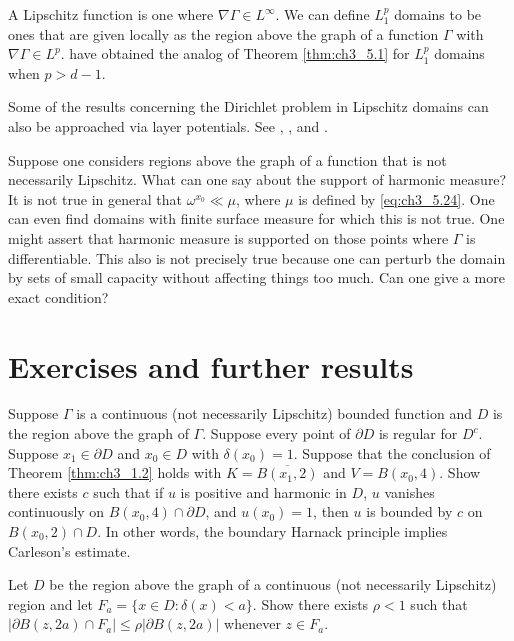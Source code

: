 
A Lipschitz function is one where $\nabla\Gamma \in L^\infty$. We can define $L_1^p$ domains to be ones that are given locally as the region above the graph of a function $\Gamma$ with $\nabla\Gamma \in L^p$. \cite{JerisonKenig1981} have obtained the analog of Theorem \ref{thm:ch3_5.1} for $L_1^p$ domains when $p > d - 1$.

Some of the results concerning the Dirichlet problem in Lipschitz domains can also be approached via layer potentials. See \cite{Verchota1984}, \cite{FabesJodeitRiviere1978}, and \cite{JerisonKenig1982a}.

Suppose one considers regions above the graph of a function that is not necessarily Lipschitz. What can one say about the support of harmonic measure? It is not true in general that $\omega^{x_0} \ll \mu$, where $\mu$ is defined by \eqref{eq:ch3_5.24}. One can even find domains with finite surface measure for which this is not true. One might assert that harmonic measure is supported on those points where $\Gamma$ is differentiable. This also is not precisely true because one can perturb the domain by sets of small capacity without affecting things too much. Can one give a more exact condition?

\section{Exercises and further results}\label{ch3_sec6}

\begin{exercise}\label{ex:ch3_1}
Suppose $\Gamma$ is a continuous (not necessarily Lipschitz) bounded function and $D$ is the region above the graph of $\Gamma$. Suppose every point of $\partial D$ is regular for $D^c$. Suppose $x_1 \in \partial D$ and $x_0 \in D$ with $\delta(x_0) = 1$. Suppose that the conclusion of Theorem \ref{thm:ch3_1.2} holds with $K = \overline{B(x_1,2)}$ and $V = B(x_0,4)$. Show there exists $c$ such that if $u$ is positive and harmonic in $D$, $u$ vanishes continuously on $B(x_0,4) \cap \partial D$, and $u(x_0) = 1$, then $u$ is bounded by $c$ on $B(x_0,2) \cap D$. In other words, the boundary Harnack principle implies Carleson's estimate.
\end{exercise}

\begin{exercise}\label{ex:ch3_2}
Let $D$ be the region above the graph of a continuous (not necessarily Lipschitz) region and let $F_a = \{x \in D : \delta(x) < a\}$. Show there exists $\rho < 1$ such that $|\partial B(z,2a) \cap F_a| \leq \rho|\partial B(z,2a)|$ whenever $z \in F_a$.
\end{exercise}

